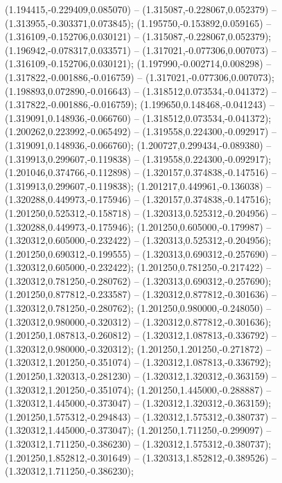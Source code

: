  (1.194415,-0.229409,0.085070) -- (1.315087,-0.228067,0.052379) -- (1.313955,-0.303371,0.073845);
 (1.195750,-0.153892,0.059165) -- (1.316109,-0.152706,0.030121) -- (1.315087,-0.228067,0.052379);
 (1.196942,-0.078317,0.033571) -- (1.317021,-0.077306,0.007073) -- (1.316109,-0.152706,0.030121);
 (1.197990,-0.002714,0.008298) -- (1.317822,-0.001886,-0.016759) -- (1.317021,-0.077306,0.007073);
 (1.198893,0.072890,-0.016643) -- (1.318512,0.073534,-0.041372) -- (1.317822,-0.001886,-0.016759);
 (1.199650,0.148468,-0.041243) -- (1.319091,0.148936,-0.066760) -- (1.318512,0.073534,-0.041372);
 (1.200262,0.223992,-0.065492) -- (1.319558,0.224300,-0.092917) -- (1.319091,0.148936,-0.066760);
 (1.200727,0.299434,-0.089380) -- (1.319913,0.299607,-0.119838) -- (1.319558,0.224300,-0.092917);
 (1.201046,0.374766,-0.112898) -- (1.320157,0.374838,-0.147516) -- (1.319913,0.299607,-0.119838);
 (1.201217,0.449961,-0.136038) -- (1.320288,0.449973,-0.175946) -- (1.320157,0.374838,-0.147516);
 (1.201250,0.525312,-0.158718) -- (1.320313,0.525312,-0.204956) -- (1.320288,0.449973,-0.175946);
 (1.201250,0.605000,-0.179987) -- (1.320312,0.605000,-0.232422) -- (1.320313,0.525312,-0.204956);
 (1.201250,0.690312,-0.199555) -- (1.320313,0.690312,-0.257690) -- (1.320312,0.605000,-0.232422);
 (1.201250,0.781250,-0.217422) -- (1.320312,0.781250,-0.280762) -- (1.320313,0.690312,-0.257690);
 (1.201250,0.877812,-0.233587) -- (1.320312,0.877812,-0.301636) -- (1.320312,0.781250,-0.280762);
 (1.201250,0.980000,-0.248050) -- (1.320312,0.980000,-0.320312) -- (1.320312,0.877812,-0.301636);
 (1.201250,1.087813,-0.260812) -- (1.320312,1.087813,-0.336792) -- (1.320312,0.980000,-0.320312);
 (1.201250,1.201250,-0.271872) -- (1.320312,1.201250,-0.351074) -- (1.320312,1.087813,-0.336792);
 (1.201250,1.320313,-0.281230) -- (1.320312,1.320312,-0.363159) -- (1.320312,1.201250,-0.351074);
 (1.201250,1.445000,-0.288887) -- (1.320312,1.445000,-0.373047) -- (1.320312,1.320312,-0.363159);
 (1.201250,1.575312,-0.294843) -- (1.320312,1.575312,-0.380737) -- (1.320312,1.445000,-0.373047);
 (1.201250,1.711250,-0.299097) -- (1.320312,1.711250,-0.386230) -- (1.320312,1.575312,-0.380737);
 (1.201250,1.852812,-0.301649) -- (1.320313,1.852812,-0.389526) -- (1.320312,1.711250,-0.386230);
